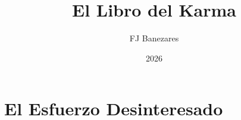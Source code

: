 \documentclass[12pt,paper=6in:9in,pagesize=pdftex,oneside,openany]{book}
\title{El Libro del Karma}
\author{FJ Banezares}
\date{2026}
\begin{document}
\frontmatter
\maketitle
\tableofcontents

\mainmatter
\chapter{El Esfuerzo Desinteresado}

\end{document}
